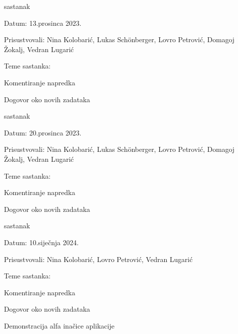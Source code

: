\begin{packed_enum}
				\item  sastanak
			\item[] \begin{packed_item}
				\item Datum: 13.prosinca 2023.
				\item Prisustvovali: Nina Kolobarić, Lukas Schönberger, Lovro Petrović, Domagoj Žokalj, Vedran Lugarić
				\item Teme sastanka:
				\begin{packed_item}
					\item  Komentiranje napredka
					\item  Dogovor oko novih zadataka
				\end{packed_item}
			\end{packed_item}
			
				\item  sastanak
			\item[] \begin{packed_item}
				\item Datum: 20.prosinca 2023.
				\item Prisustvovali: Nina Kolobarić, Lukas Schönberger, Lovro Petrović, Domagoj Žokalj, Vedran Lugarić
				\item Teme sastanka:
				\begin{packed_item}
					\item  Komentiranje napredka
					\item  Dogovor oko novih zadataka
				\end{packed_item}
			\end{packed_item}
			
			\item  sastanak
			\item[] \begin{packed_item}
				\item Datum: 10.siječnja 2024.
				\item Prisustvovali:  Nina Kolobarić, Lovro Petrović, Vedran Lugarić
				\item Teme sastanka:
				\begin{packed_item}
					\item  Komentiranje napredka
					\item  Dogovor oko novih zadataka
					\item  Demonstracija alfa inačice aplikacije
				\end{packed_item}
			\end{packed_item}
			

\end{packed_enum}
